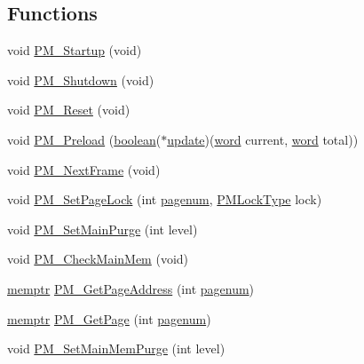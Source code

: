 \subsection*{Functions}
\begin{DoxyCompactItemize}
\item 
void \hyperlink{ID__PM_8H_a5e5ef876a9184793502a2a5b6884e2d0}{PM\_\-Startup} (void)
\item 
void \hyperlink{ID__PM_8H_a4c8f2bd44f288cb9d7d9c4abe52ffa8c}{PM\_\-Shutdown} (void)
\item 
void \hyperlink{ID__PM_8H_a25eb3f2f08365f6707cb60a298b2366e}{PM\_\-Reset} (void)
\item 
void \hyperlink{ID__PM_8H_ab97049dc4c67f252768239ca432f4204}{PM\_\-Preload} (\hyperlink{ID__HEAD_8H_a7c6368b321bd9acd0149b030bb8275ed}{boolean}($\ast$\hyperlink{WL__PLAY_8C_a377ee66e839b90ae7140bb0dbde6c696}{update})(\hyperlink{ID__HEAD_8H_abad51e07ab6d26bec9f1f786c8d65bcd}{word} current, \hyperlink{ID__HEAD_8H_abad51e07ab6d26bec9f1f786c8d65bcd}{word} total))
\item 
void \hyperlink{ID__PM_8H_a18e14139add000a914aa1c385ad33f34}{PM\_\-NextFrame} (void)
\item 
void \hyperlink{ID__PM_8H_a1e7da5d85fc01341f8f9a893ddc87cfc}{PM\_\-SetPageLock} (int \hyperlink{WL__TEXT_8C_ad303d1f16fd753775f930d896512b75b}{pagenum}, \hyperlink{ID__PM_8H_a470960f2645467be319a542ef1f65851}{PMLockType} lock)
\item 
void \hyperlink{ID__PM_8H_aaf911d3a6de179ab5a3bc27e9d263a99}{PM\_\-SetMainPurge} (int level)
\item 
void \hyperlink{ID__PM_8H_a2a4e1e1198255c4890972680f9fb5a15}{PM\_\-CheckMainMem} (void)
\item 
\hyperlink{ID__MM_8H_a04062decc7eb282b066c65e9137bb9bf}{memptr} \hyperlink{ID__PM_8H_a6d8376b84fdfd88c991b82d9d9cebcfd}{PM\_\-GetPageAddress} (int \hyperlink{WL__TEXT_8C_ad303d1f16fd753775f930d896512b75b}{pagenum})
\item 
\hyperlink{ID__MM_8H_a04062decc7eb282b066c65e9137bb9bf}{memptr} \hyperlink{ID__PM_8H_a80f33d5bd3e0a9a388063a78edf53329}{PM\_\-GetPage} (int \hyperlink{WL__TEXT_8C_ad303d1f16fd753775f930d896512b75b}{pagenum})
\item 
void \hyperlink{ID__PM_8H_a5182c3fcfa8dd2f64fa5e9b8254dc991}{PM\_\-SetMainMemPurge} (int level)
\end{DoxyCompactItemize}

